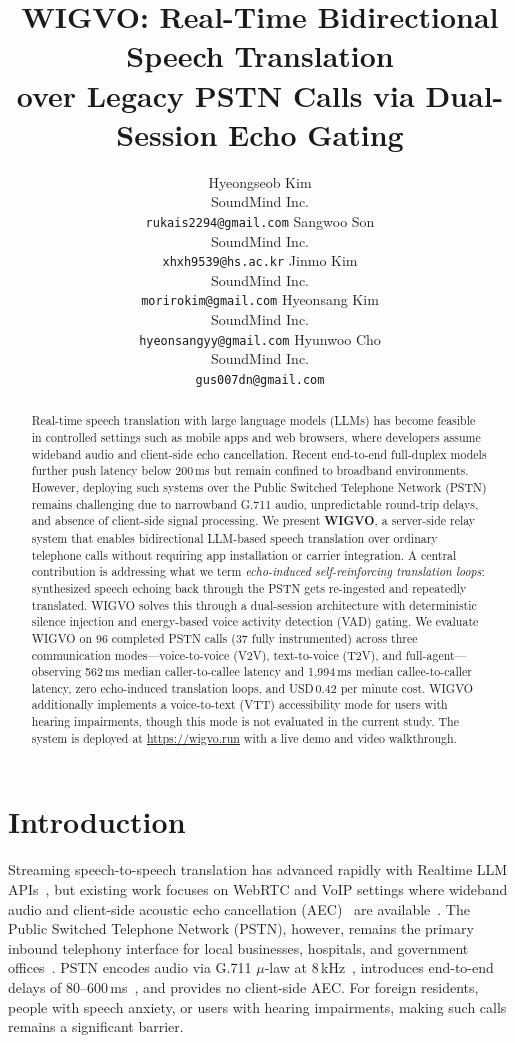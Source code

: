 \documentclass[11pt]{article}
\title{WIGVO: Real-Time Bidirectional Speech Translation\\over Legacy PSTN Calls via Dual-Session Echo Gating}
\author{
  Hyeongseob Kim \\
  SoundMind Inc. \\
  \texttt{rukais2294@gmail.com}
  \AND
  Sangwoo Son \\
  SoundMind Inc. \\
  \texttt{xhxh9539@hs.ac.kr}
  \AND
  Jinmo Kim \\
  SoundMind Inc. \\
  \texttt{morirokim@gmail.com}
  \AND
  Hyeonsang Kim \\
  SoundMind Inc. \\
  \texttt{hyeonsangyy@gmail.com}
  \AND
  Hyunwoo Cho \\
  SoundMind Inc. \\
  \texttt{gus007dn@gmail.com}
}
\begin{document}
\maketitle

\begin{abstract}
Real-time speech translation with large language models (LLMs) has become feasible in controlled settings such as mobile apps and web browsers, where developers assume wideband audio and client-side echo cancellation. Recent end-to-end full-duplex models further push latency below 200\,ms but remain confined to broadband environments. However, deploying such systems over the Public Switched Telephone Network (PSTN) remains challenging due to narrowband G.711 audio, unpredictable round-trip delays, and absence of client-side signal processing. We present \textbf{WIGVO}, a server-side relay system that enables bidirectional LLM-based speech translation over ordinary telephone calls without requiring app installation or carrier integration. A central contribution is addressing what we term \emph{echo-induced self-reinforcing translation loops}: synthesized speech echoing back through the PSTN gets re-ingested and repeatedly translated. WIGVO solves this through a dual-session architecture with deterministic silence injection and energy-based voice activity detection (VAD) gating. We evaluate WIGVO on 96 completed PSTN calls (37 fully instrumented) across three communication modes---voice-to-voice (V2V), text-to-voice (T2V), and full-agent---observing 562\,ms median caller-to-callee latency and 1{,}994\,ms median callee-to-caller latency, zero echo-induced translation loops, and USD\,0.42 per minute cost. WIGVO additionally implements a voice-to-text (VTT) accessibility mode for users with hearing impairments, though this mode is not evaluated in the current study. The system is deployed at \url{https://wigvo.run} with a live demo and video walkthrough.
\end{abstract}

\section{Introduction}

Streaming speech-to-speech translation has advanced rapidly with Realtime LLM APIs~\citep{openai_realtime_api_2024}, but existing work focuses on WebRTC and VoIP settings where wideband audio and client-side acoustic echo cancellation (AEC)~\citep{itu_g168_2015} are available~\citep{seamless_streaming_2023,whisper_radford_2023}. The Public Switched Telephone Network (PSTN), however, remains the primary inbound telephony interface for local businesses, hospitals, and government offices~\citep{itu_pstn_overview_2020}. PSTN encodes audio via G.711 $\mu$-law at 8\,kHz~\citep{itu_g711_1988}, introduces end-to-end delays of 80--600\,ms~\citep{itu_g114_2003}, and provides no client-side AEC. For foreign residents, people with speech anxiety, or users with hearing impairments, making such calls remains a significant barrier.
\end{document}
